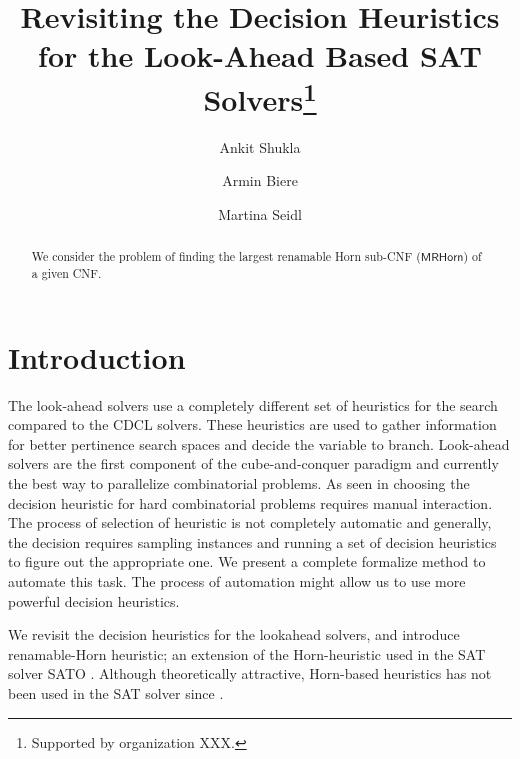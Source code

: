 \documentclass[runningheads]{llncs}
\newcommand{\rhorn}{\mathsf{MRHorn}}
\begin{document}
%
\title{Revisiting the Decision Heuristics for the Look-Ahead Based SAT Solvers\thanks{Supported by organization  XXX.}}
%
%
\author{Ankit Shukla \and Armin Biere \and Martina Seidl}

%
%
\maketitle              %
%
\begin{abstract}
We consider the problem of finding the largest renamable Horn sub-CNF ($\rhorn$) of a given CNF.

\end{abstract}

\section{Introduction} \label{sec:introduction}
The look-ahead solvers use a completely different set of heuristics for the search compared to the CDCL solvers. These heuristics are used to gather information for better pertinence search spaces and decide the variable to branch. Look-ahead solvers are the first component of the cube-and-conquer paradigm and currently the best way to parallelize combinatorial problems. As seen in \cite{Heule18Schur} choosing the decision heuristic for hard combinatorial problems requires manual interaction. The process of selection of heuristic is not completely automatic and generally, the decision requires sampling instances and running a set of decision heuristics to figure out the appropriate one. We present a complete formalize method to automate this task. The process of automation might allow us to use more powerful decision heuristics. 

We revisit the decision heuristics for the lookahead solvers, and introduce renamable-Horn heuristic; an extension of the Horn-heuristic used in the SAT solver SATO \cite{Zhang97Sato}. Although theoretically attractive, Horn-based heuristics has not been used in the SAT solver since \cite{Zhang97Sato}.
\end{document}
